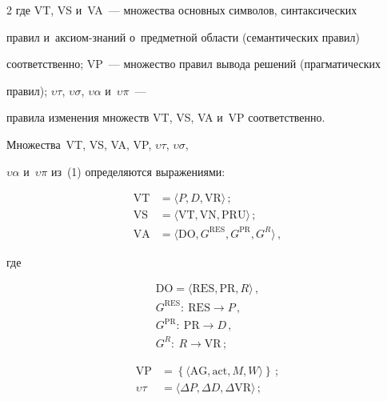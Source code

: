 \begin{multicols}{2}
где VT, VS и~VA~--- множества основных символов, синтаксических 


правил и~ак\-си\-ом-зна\-ний о~предметной области (семантических правил) 


соответственно; VP~--- множество правил вывода решений (прагматических 


правил); $\upsilon\tau$, $\upsilon\sigma$, $\upsilon\alpha$ и~$\upsilon\pi$~--- 


правила изменения множеств VT, VS, VA и~VP соответственно. 


Множества~VT, VS, VA, VP, $\upsilon\tau$, $\upsilon\sigma$, 


$\upsilon\alpha$ и~$\upsilon\pi$  из~(1) определяются выражениями:


\begin{align}


\mathrm{VT}&=\langle P,D, \mathrm{VR}\rangle\,;\label{e2-ls}\\


\mathrm{VS} &= \langle \mathrm{VT}, \mathrm{VN}, \mathrm{PRU}\rangle\,;\label{e3-ls}\\


\mathrm{VA} &= \langle \mathrm{DO}, G^{\mathrm{RES}}, G^{\mathrm{PR}}, G^R\rangle\,,\label{e4-ls}


   \end{align}


где


   \begin{gather*}


   \mathrm{DO} = \langle \mathrm{RES}, \mathrm{PR}, R\rangle\,,\\


   G^{\mathrm{RES}}:\ \mathrm{RES}\to P\,,\\ 


   G^{\mathrm{PR}}:\ \mathrm{PR}\to D\,,\\ 


   G^R:\ R\to \mathrm{VR}\,;




   \end{gather*}


   \begin{align}


   \mathrm{VP}&=\left\{\langle \mathrm{AG}, \mathrm{act}, M, W\rangle\right\}\,;\label{e6-ls}\\


   \upsilon\tau &= \langle \Delta P, \Delta D, \Delta \mathrm{VR}\rangle\,;\label{e7-ls}\\



\end{align}
\end{multicols}
